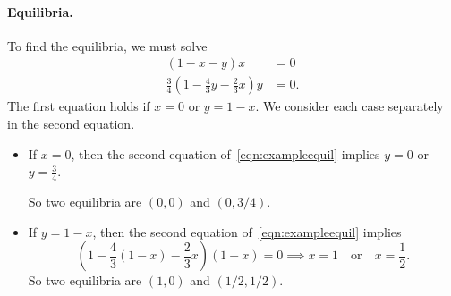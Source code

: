 \documentclass{book}
\begin{document}
\paragraph{Equilibria.}
To find the equilibria, we must solve
\begin{equation}
\begin{split}
(1-x-y)x & = 0 \\
\frac{3}{4}\left(1 -\frac{4}{3}y - \frac{2}{3}x\right)y & = 0.
\end{split}
\label{eqn:exampleequil}
\end{equation}
The first equation holds if $x=0$ or $y = 1-x$.
We consider each case separately in the second equation.
\begin{itemize}
\item
If $x=0$, then the second equation of~\eqref{eqn:exampleequil} implies
$y=0$ or $y=\frac{3}{4}$.

So two equilibria are $(0,0)$ and $(0,3/4)$.
\item
If $y=1-x$, then the second equation
of~\eqref{eqn:exampleequil} implies
\begin{equation}
  \left(1-\frac{4}{3}(1-x) - \frac{2}{3}x\right)(1-x) = 0
  \implies x=1 \quad \textrm{or} \quad x=\frac{1}{2}.
\end{equation}
So two equilibria are $(1,0)$ and $(1/2,1/2)$.
\end{itemize}
\end{document}
